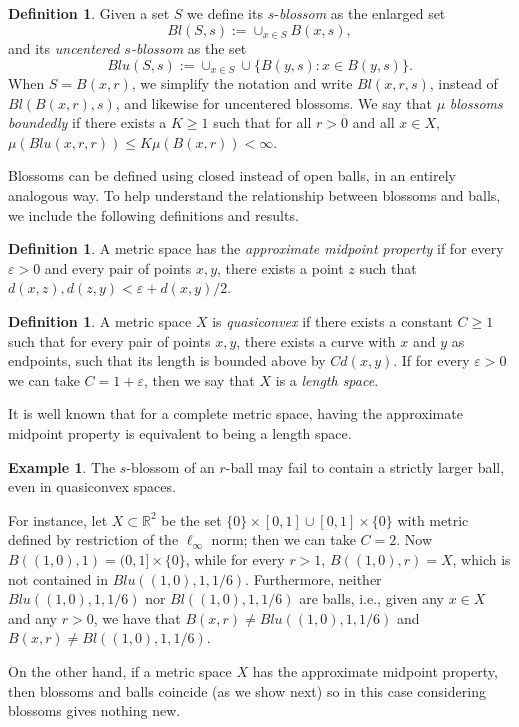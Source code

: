 \documentclass[12pt]{amsart}
\theoremstyle{definition}
\newtheorem{definition}[theorem]{Definition}
\newtheorem{example}[theorem]{Example}
\theoremstyle{parrafo}
\begin{document}
\begin{definition} Given a set $S$ we define its $s$-{\em blossom} as the enlarged set
\begin{equation} \label{altblossom}
Bl(S, s):= \cup_{x\in S}B(x,s),
 \end{equation}
 and its  {\em uncentered $s$-blossom} as the set
\begin{equation} \label{altublossom}
Blu(S, s):= \cup_{x\in S}\cup\{B(y, s): x\in B(y, s)\}.
 \end{equation}
When $S= B(x,r)$, we simplify the notation and write  $Bl(x,r, s)$, 
instead of $Bl(B(x,r), s)$, and likewise for uncentered blossoms. 
 We say that $\mu$ {\em blossoms boundedly} if there exists a $K\ge 1$ such that
 for all $r>0 $ and all $x\in X$, $\mu (Blu(x, r, r)) \le K \mu(B(x,r)) < \infty$. 
\end{definition}

Blossoms can be defined using closed instead of open balls, in
an entirely analogous way. To help understand the relationship between blossoms and balls,
we include the following definitions and results.



\begin{definition} A metric space  has the {\it approximate midpoint property} if for every
$\varepsilon > 0$ and every pair of points $x,y$, there exists a point $z$ such
that $d(x,z), d(z,y) <  \varepsilon + d(x,y)/2$.
\end{definition}

\begin{definition} \label{quasi}A metric space $X$  is  {\it quasiconvex} if there exists a constant
$C\ge 1$ such that for every
 pair of points $x,y$, there exists a curve with $x$ and $y$ as endpoints, such
 that its length is bounded above by $C d(x,y)$. If for every $\varepsilon > 0$ we can take  $C=1 + \varepsilon$, then we say that $X$ is a {\it length space}.
 \end{definition} 

It is well known that for a complete metric space, having the approximate midpoint property is equivalent
to being a length space.



\begin{example} \label{blossomsballs} The $s$-blossom of an $r$-ball may fail to contain a strictly larger ball,
even in quasiconvex spaces. 

For instance, let $X \subset  \mathbb{R}^2$ be the set $\{0\} \times [0,1]  \cup [0,1]\times \{0\}$ with metric
defined by restriction of the $\ell_\infty$ norm; then we can take $C = 2$. Now $B((1,0), 1) = (0,1]\times \{0\}$,
while for every $r > 1$,  $B((1,0), r) = X$, which is not contained in  $Blu((1,0), 1, 1/6)$. Furthermore, neither
$Blu((1,0), 1, 1/6)$ nor $Bl((1,0), 1, 1/6)$ are balls, i.e., given any $x\in X$ and any $r > 0$, we have
that $B(x, r) \ne Blu((1,0), 1, 1/6)$ and $B(x, r) \ne Bl((1,0), 1, 1/6)$.


On the other hand, if a  metric space $X$  has the approximate midpoint property,  then blossoms and
 balls coincide  (as we show next)
so in this case  considering
 blossoms gives nothing new. 
\end{example}
\end{document}
